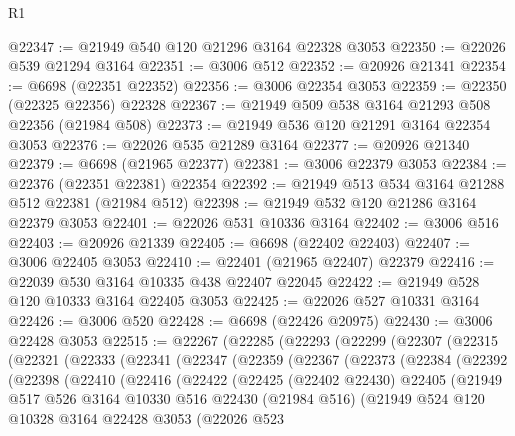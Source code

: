 \begin{lexlean}{R1}
\begin{coremodule}
@22347 := @21949 @540 @120 @21296 @3164 @22328 @3053
@22350 := @22026 @539 @21294 @3164
@22351 := @3006 @512
@22352 := @20926 @21341
@22354 := @6698 (@22351 @22352)
@22356 := @3006 @22354 @3053
@22359 := @22350 (@22325 @22356) @22328
@22367 := @21949 @509 @538 @3164 @21293 @508 @22356 (@21984 @508)
@22373 := @21949 @536 @120 @21291 @3164 @22354 @3053
@22376 := @22026 @535 @21289 @3164
@22377 := @20926 @21340
@22379 := @6698 (@21965 @22377)
@22381 := @3006 @22379 @3053
@22384 := @22376 (@22351 @22381) @22354
@22392 := @21949 @513 @534 @3164 @21288 @512 @22381 (@21984 @512)
@22398 := @21949 @532 @120 @21286 @3164 @22379 @3053
@22401 := @22026 @531 @10336 @3164
@22402 := @3006 @516
@22403 := @20926 @21339
@22405 := @6698 (@22402 @22403)
@22407 := @3006 @22405 @3053
@22410 := @22401 (@21965 @22407) @22379
@22416 := @22039 @530 @3164 @10335 @438 @22407 @22045
@22422 := @21949 @528 @120 @10333 @3164 @22405 @3053
@22425 := @22026 @527 @10331 @3164
@22426 := @3006 @520
@22428 := @6698 (@22426 @20975)
@22430 := @3006 @22428 @3053
@22515 := @22267
    (@22285
      (@22293
        (@22299
          (@22307
            (@22315
              (@22321
                (@22333
                  (@22341
                    (@22347
                      (@22359
                        (@22367
                          (@22373
                            (@22384
                              (@22392
                                (@22398
                                  (@22410
                                    (@22416
                                      (@22422
                                        (@22425
                                          (@22402 @22430)
                                          @22405
                                          (@21949
                                            @517
                                            @526
                                            @3164
                                            @10330
                                            @516
                                            @22430
                                            (@21984 @516)
                                            (@21949
                                              @524
                                              @120
                                              @10328
                                              @3164
                                              @22428
                                              @3053
                                              (@22026
                                                @523

\end{coremodule}
\end{lexlean}
